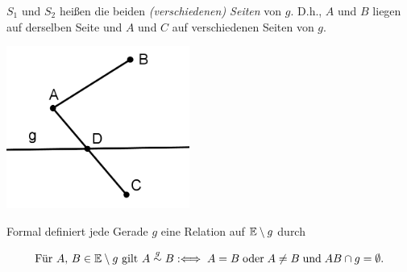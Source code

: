 $S_1$ und $S_2$ heißen die beiden \emph{(verschiedenen) Seiten} von $g$. D.h., $A$ und $B$
liegen auf derselben Seite und $A$ und $C$ auf verschiedenen Seiten von $g$.

\centerline{\includegraphics[width=6cm]{BILDER/1-1-06a-Seiten.png}}

Formal definiert jede Gerade $g$ eine Relation auf $\mathbb E\setminus g$ durch

$$
    \mbox{Für } A,\, B \in \mathbb E \setminus g \mbox{ gilt } A \stackrel{g}{\sim} B :
    \Longleftrightarrow\; A=B\; \mbox{oder}\; A \neq B\; \mbox{und}\; {AB} \cap g = \emptyset.
$$

